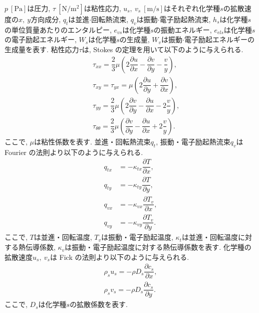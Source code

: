 $p~\mathrm{[Pa]}$は圧力,
$\tau~\mathrm{[N/m^2]}$は粘性応力,
$u_s,\ v_s~\mathrm{[m/s]}$はそれぞれ化学種$s$の拡散速度の$x,\ y$方向成分,
$q_t$は並進$\cdot$回転熱流束,
$q_v$は振動$\cdot$電子励起熱流束,
$h_s$は化学種$s$の単位質量あたりのエンタルピー,
$e_{vs}$は化学種$s$の振動エネルギー,
$e_{els}$は化学種$s$の電子励起エネルギー,
$W_s$は化学種$s$の生成量,
$W_v$は振動$\cdot$電子励起エネルギーの生成量を表す.
%
粘性応力$\tau$は,
Stokes の定理を用いて以下のように与えられる.
\begin{eqnarray}
  &&\tau_{xx}=\dfrac{2}{3}\mu \left( 2\dfrac{\partial u}{\partial x}-\dfrac{\partial v}{\partial y}-\dfrac{v}{y} \right),\\
  &&\tau_{xy}=\tau_{yx}=\mu \left( 2\dfrac{\partial u}{\partial y}+\dfrac{\partial v}{\partial x} \right),\\
  &&\tau_{yy}=\dfrac{2}{3}\mu \left( 2\dfrac{\partial v}{\partial y}-\dfrac{\partial u}{\partial x}-2\dfrac{v}{y} \right),\\
  &&\tau_{\theta \theta}=\dfrac{2}{3}\mu \left( \dfrac{\partial v}{\partial y}-\dfrac{\partial u}{\partial x}+2\dfrac{v}{y} \right).
\end{eqnarray}
ここで,
$\mu$は粘性係数を表す.
%
並進・回転熱流束$q_t$,
振動・電子励起熱流束$q_v$は Fourier の法則より以下のように与えられる.
\begin{align}
q_{tx}&=-\kappa_{tx}\dfrac{\partial{T}}{\partial{x}},\\
q_{ty}&=-\kappa_{ty}\dfrac{\partial{T}}{\partial{y}},\\
q_{vx}&=-\kappa_{vx}\dfrac{\partial{T_v}}{\partial{x}},\\
q_{vy}&=-\kappa_{vy}\dfrac{\partial{T_v}}{\partial{y}}.
\end{align}
ここで,
$T$は並進・回転温度,
$T_v$は振動・電子励起温度,
$\kappa_t$は並進・回転温度に対する熱伝導係数,
$\kappa_v$は振動・電子励起温度に対する熱伝導係数を表す.
%
化学種の拡散速度$u_s,\ v_s$は Fick の法則より以下のように与えられる.
\begin{align}
\rho_{s}u_{s}=-\rho D_s\dfrac{\partial{c_s}}{\partial{x}},\\ 
\rho_{s}v_{s}=-\rho D_s\dfrac{\partial{c_s}}{\partial{y}}.
\end{align}
ここで,
$D_s$は化学種$s$の拡散係数を表す.

